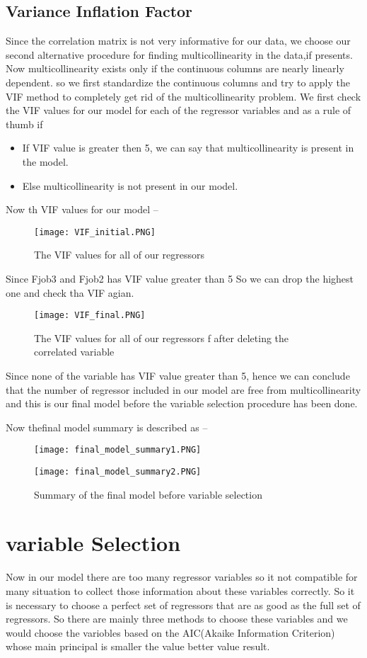 \documentclass[A4paper,11pt]{report}
\begin{document}
	 	\subsection{Variance Inflation Factor}
	 Since the correlation matrix is not very informative for our data, we choose our second alternative procedure for finding multicollinearity in the data,if presents. Now multicollinearity exists only if the continuous columns are nearly linearly dependent. so we first standardize the continuous columns and try to apply the VIF method to completely get rid of the multicollinearity problem.
	 We first check the VIF values for our model for each of the regressor variables and as a rule of thumb if 
	 \begin{itemize}
	 	\item If VIF value is greater then 5, we can say that multicollinearity is present in the model.
	 	\item Else multicollinearity is not present in our model.
	 \end{itemize}
 	Now th VIF values for our model --
 	 \begin{figure}[H]
 		\texttt{[image: VIF\_initial.PNG]}
 		\caption {The VIF values for all of our regressors}
 	\end{figure}
     Since Fjob3 and Fjob2 has VIF value greater than 5 So we can drop the highest one and check tha VIF agian.
     \begin{figure}[H]
     	\texttt{[image: VIF\_final.PNG]}
     	\caption {The VIF values for all of our regressors f after deleting the correlated variable}
     \end{figure}
	 Since none of the variable has VIF value greater than 5, hence we can conclude that the number of regressor included in our model are free from multicollinearity and this is our final model before the variable selection procedure has been done.
	 \par Now thefinal model summary is described as --
	 \begin{figure}[H]
	 	\texttt{[image: final\_model\_summary1.PNG]}
	 \end{figure}
	\begin{figure}[H]
		\texttt{[image: final\_model\_summary2.PNG]}
		\caption {Summary of the final model before variable selection}
	\end{figure}
	 \section{variable Selection}
	 Now in our model there are too many regressor variables so it not compatible for many situation to collect those information about these variables correctly. So it is necessary to choose a perfect set of regressors that are as good as the full set of regressors. So there are mainly three methods to choose these variables and we would choose the variobles based on the AIC(Akaike Information Criterion) whose main principal is smaller the value better value result.
\end{document}
